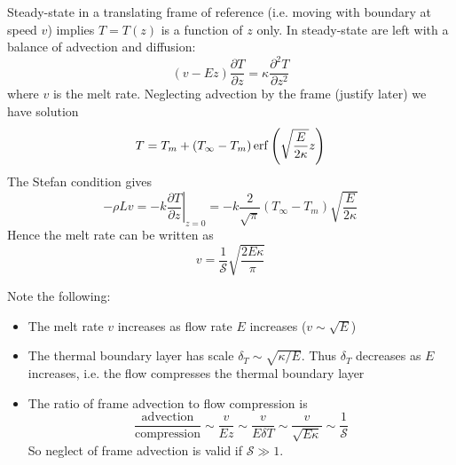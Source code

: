 \documentclass{jknotes}
\begin{document}
Steady-state in a translating frame of reference (i.e. moving with boundary at
speed $v$) implies $T = T(z)$ is a function of $z$ only. In steady-state are
left with a balance of advection and diffusion:
\begin{equation}
	(v-Ez)\frac{\partial T}{\partial z} = \kappa \frac{\partial^2 T}{\partial
	z^2}
\end{equation}
where $v$ is the melt rate. Neglecting advection by the frame (justify later)
we have solution
\begin{equation}
	T = T_m + (T_{\infty} - T_m) \erf \left( \sqrt{\frac{E}{2\kappa}} z \right)
\end{equation}
The Stefan condition gives
\begin{equation}
	-\rho L v = - k\left.\frac{\partial T}{\partial z} \right|_{z=0} = -k
	\frac{2}{\sqrt{\pi}} (T_\infty - T_m) \sqrt{\frac{E}{2\kappa}}
\end{equation}
Hence the melt rate can be written as
\begin{equation}
	v = \frac{1}{\mathcal{S}} \sqrt{\frac{2E \kappa}{\pi}}
\end{equation}

Note the following:
\begin{itemize}
	\item The melt rate $v$ increases as flow rate $E$ increases ($v \sim
		\sqrt{E}$)
	\item The thermal boundary layer has scale $\delta_T \sim \sqrt{\kappa/E}$.
		Thus $\delta_T$ decreases as $E$ increases, i.e. the flow compresses
		the thermal boundary layer
	\item The ratio of frame advection to flow compression is
		\begin{equation}
			\frac{\text{advection}}{\text{compression}} \sim \frac{v}{Ez} \sim
			\frac{v}{E\delta T} \sim \frac{v}{\sqrt{E\kappa}} \sim
			\frac{1}{\mathcal{S}}
		\end{equation}
		So neglect of frame advection is valid if $\mathcal{S} \gg 1$.
\end{itemize}
\end{document}
